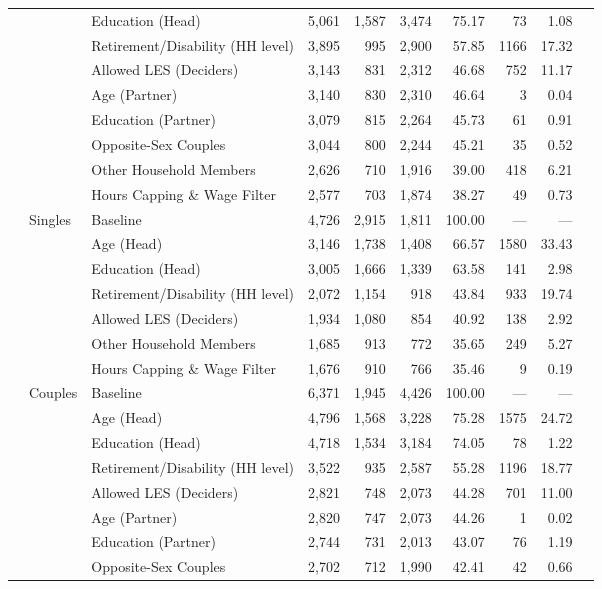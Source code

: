 \begin{longtable}{llp{3.8cm}rrrrrrr}
 &  & Education (Head) & 5,061 & 1,587 & 3,474 & 75.17 & 73 & 1.08 \\
 &  & Retirement/Disability (HH level) & 3,895 & 995 & 2,900 & 57.85 & 1166 & 17.32 \\
 &  & Allowed LES (Deciders) & 3,143 & 831 & 2,312 & 46.68 & 752 & 11.17 \\
 &  & Age (Partner) & 3,140 & 830 & 2,310 & 46.64 & 3 & 0.04 \\
 &  & Education (Partner) & 3,079 & 815 & 2,264 & 45.73 & 61 & 0.91 \\
 &  & Opposite-Sex Couples & 3,044 & 800 & 2,244 & 45.21 & 35 & 0.52 \\
 &  & Other Household Members & 2,626 & 710 & 1,916 & 39.00 & 418 & 6.21 \\
 &  & Hours Capping \& Wage Filter & 2,577 & 703 & 1,874 & 38.27 & 49 & 0.73 \\
\addlinespace[3pt]
2016 & Singles & Baseline & 4,726 & 2,915 & 1,811 & 100.00 & — & — \\
 &  & Age (Head) & 3,146 & 1,738 & 1,408 & 66.57 & 1580 & 33.43 \\
 &  & Education (Head) & 3,005 & 1,666 & 1,339 & 63.58 & 141 & 2.98 \\
 &  & Retirement/Disability (HH level) & 2,072 & 1,154 & 918 & 43.84 & 933 & 19.74 \\
 &  & Allowed LES (Deciders) & 1,934 & 1,080 & 854 & 40.92 & 138 & 2.92 \\
 &  & Other Household Members & 1,685 & 913 & 772 & 35.65 & 249 & 5.27 \\
 &  & Hours Capping \& Wage Filter & 1,676 & 910 & 766 & 35.46 & 9 & 0.19 \\
\addlinespace[3pt]
2017 & Couples & Baseline & 6,371 & 1,945 & 4,426 & 100.00 & — & — \\
 &  & Age (Head) & 4,796 & 1,568 & 3,228 & 75.28 & 1575 & 24.72 \\
 &  & Education (Head) & 4,718 & 1,534 & 3,184 & 74.05 & 78 & 1.22 \\
 &  & Retirement/Disability (HH level) & 3,522 & 935 & 2,587 & 55.28 & 1196 & 18.77 \\
 &  & Allowed LES (Deciders) & 2,821 & 748 & 2,073 & 44.28 & 701 & 11.00 \\
 &  & Age (Partner) & 2,820 & 747 & 2,073 & 44.26 & 1 & 0.02 \\
 &  & Education (Partner) & 2,744 & 731 & 2,013 & 43.07 & 76 & 1.19 \\
 &  & Opposite-Sex Couples & 2,702 & 712 & 1,990 & 42.41 & 42 & 0.66 \\

\end{longtable}
